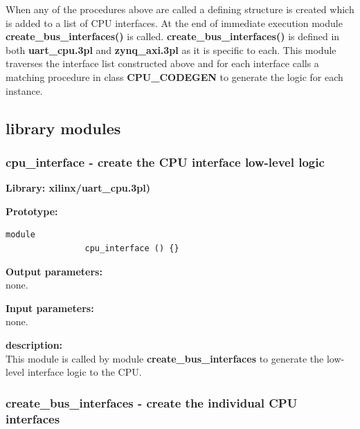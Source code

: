     When any of the procedures above are called a defining structure is
    created which is added to a list of CPU interfaces. At the end
    of immediate execution module {\bf create\_bus\_interfaces()} is called.
    {\bf create\_bus\_interfaces()} is defined in both {\bf uart\_cpu.3pl}
    and {\bf zynq\_axi.3pl} as it is specific to each. This module
    traverses the interface list constructed above and for each interface
    calls a matching procedure in class {\bf CPU\_CODEGEN} to generate the
    logic for each instance.








    \subsection{library modules}
    



        \subsubsection{cpu\_interface - create the CPU interface low-level logic}\label{sec:lmuartcpui}

            {\bf Library: xilinx/uart\_cpu.3pl)}

            {\bf Prototype:} \\
            \vsp
            \begin{lstlisting}[gobble=12, language=threepl]
                module
                cpu_interface () {}
            \end{lstlisting}
            
            {\bf Output parameters:} \\
            
                none.                       
            
            {\bf Input parameters:} \\
            
                none.
                       
            {\bf description:} \\
            This module is called by module {\bf create\_bus\_interfaces}
            to generate the low-level interface logic to the CPU.




        \subsubsection{create\_bus\_interfaces - create the individual CPU interfaces}\label{sec:lmuartcpucbi}

